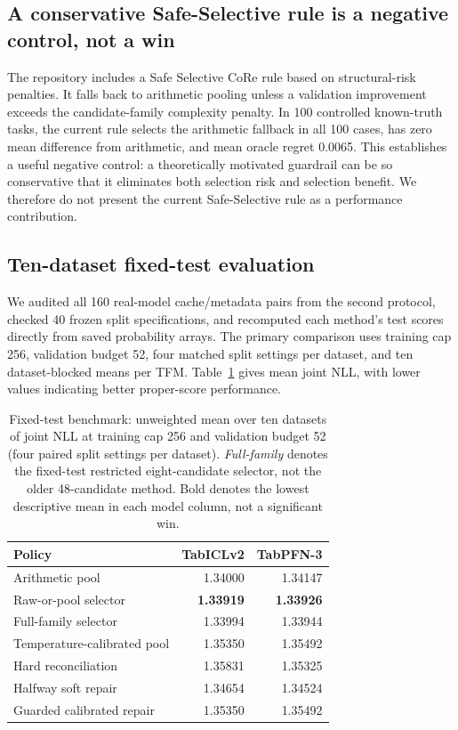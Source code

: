 \documentclass[a4paper,fleqn]{cas-sc}
\begin{document}
\subsection{A conservative Safe-Selective rule is a negative control, not a win}
The repository includes a Safe Selective CoRe rule based on structural-risk penalties. It falls back to arithmetic pooling unless a validation improvement exceeds the candidate-family complexity penalty. In 100 controlled known-truth tasks, the current rule selects the arithmetic fallback in all 100 cases, has zero mean difference from arithmetic, and mean oracle regret 0.0065. This establishes a useful negative control: a theoretically motivated guardrail can be so conservative that it eliminates both selection risk and selection benefit. We therefore do not present the current Safe-Selective rule as a performance contribution.


\subsection{Ten-dataset fixed-test evaluation}
\label{sec:newprimary}
We audited all 160 real-model cache/metadata pairs from the second protocol, checked 40 frozen split specifications, and recomputed each method's test scores directly from saved probability arrays. The primary comparison uses training cap 256, validation budget 52, four matched split settings per dataset, and ten dataset-blocked means per TFM. Table~\ref{tab:newprimary} gives mean joint NLL, with lower values indicating better proper-score performance.

\begin{table}[t]
\centering
\caption{Fixed-test benchmark: unweighted mean over ten datasets of joint NLL at training cap 256 and validation budget 52 (four paired split settings per dataset). \emph{Full-family} denotes the fixed-test restricted eight-candidate selector, not the older 48-candidate method. Bold denotes the lowest descriptive mean in each model column, not a significant win.}
\label{tab:newprimary}
\begin{tabular}{lrr}
\toprule
Policy & TabICLv2 & TabPFN-3\\
\midrule
Arithmetic pool & 1.34000 & 1.34147\\
Raw-or-pool selector & \textbf{1.33919} & \textbf{1.33926}\\
Full-family selector & 1.33994 & 1.33944\\
Temperature-calibrated pool & 1.35350 & 1.35492\\
Hard reconciliation & 1.35831 & 1.35325\\
Halfway soft repair & 1.34654 & 1.34524\\
Guarded calibrated repair & 1.35350 & 1.35492\\
\bottomrule
\end{tabular}
\end{table}
\end{document}

